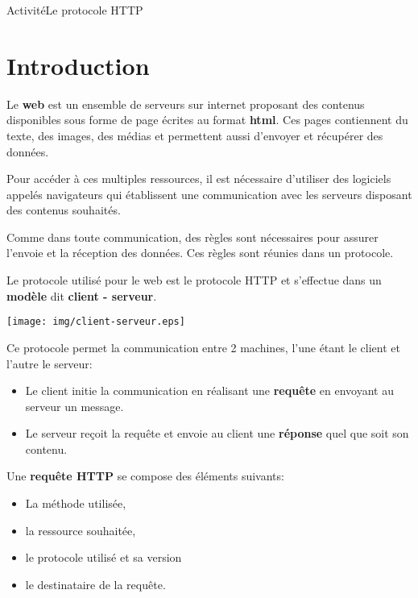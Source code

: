\documentclass[12pt,a4paper]{article}
\begin{document}
\begin{NSI}
{Activité}{Le protocole HTTP}
\end{NSI}

\section{Introduction}

Le \textbf{web} est un ensemble de serveurs sur internet proposant des contenus disponibles sous forme de page écrites au format \textbf{html}. Ces pages contiennent du texte, des images, des médias et permettent aussi d'envoyer et récupérer des données. \medskip

Pour accéder à ces multiples ressources, il est nécessaire d'utiliser des logiciels appelés navigateurs qui établissent une communication avec les serveurs disposant des contenus souhaités.

Comme dans toute communication, des règles sont nécessaires pour assurer l'envoie et la réception des données. Ces règles sont réunies dans un protocole.

Le protocole utilisé pour le web est le protocole HTTP et s'effectue dans un \textbf{modèle} dit \textbf{client - serveur}. 

\begin{center}
\texttt{[image: img/client-serveur.eps]}
\end{center}

Ce protocole permet la communication entre 2 machines, l'une étant le client et l'autre le serveur:

\begin{itemize}[label=\textbullet]
\item Le client initie la communication en réalisant une \textbf{requête} en envoyant au serveur un message.
\item Le serveur reçoit la requête et envoie au client une \textbf{réponse} quel que soit son contenu.
\end{itemize}

\noindent Une \textbf{requête HTTP} se compose des éléments suivants:
\begin{itemize}[label=\textbullet]
\item La méthode utilisée, 
\item la ressource souhaitée, 
\item le protocole utilisé et sa version
\item le destinataire de la requête.
\end{itemize}\medskip
\end{document}
